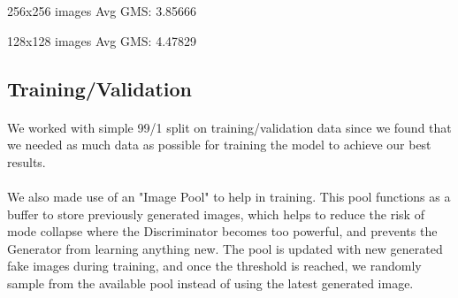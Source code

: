 \documentclass[twoside,english,notitlepage]{report}
\begin{document}
\vspace{20pt}
\begin{minipage}[t]{.47\textwidth}
    \centering
    256x256 images Avg GMS: 3.85666
\end{minipage}
\begin{minipage}[t]{.47\textwidth}
    \centering
    128x128 images Avg GMS: 4.47829
\end{minipage}

\subsection{Training/Validation}
\paragraph{} We worked with simple 99/1 split on training/validation data since we found that we needed as much data as possible for training the model to achieve our best results.

\paragraph{} We also made use of an "Image Pool" to help in training. This pool functions as a buffer to store previously generated images, which helps to reduce the risk of mode collapse where the Discriminator becomes too powerful, and prevents the Generator from learning anything new. The pool is updated with new generated fake images during training, and once the threshold is reached, we randomly sample from the available pool instead of using the latest generated image. 
\end{document}
